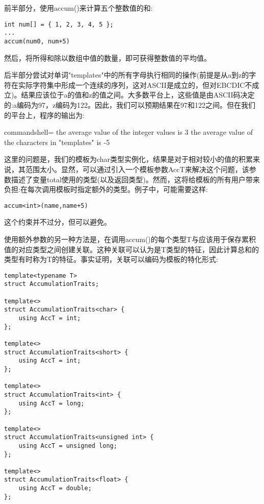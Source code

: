 前半部分，使用accum()来计算五个整数值的和:

\begin{lstlisting}[style=styleCXX]
int num[] = { 1, 2, 3, 4, 5 };
...
accum(num0, num+5)
\end{lstlisting}

然后，将所得和除以数组中值的数量，即可获得整数值的平均值。

后半部分尝试对单词"templates"中的所有字母执行相同的操作(前提是从a到z的字符在实际字符集中形成一个连续的序列，这对ASCII是成立的，但对EBCDIC不成立)。结果应该位于a的值和z的值之间。大多数平台上，这些值是由ASCII码决定的:a编码为97，z编码为122。因此，我们可以预期结果在97和122之间。但在我们的平台上，程序的输出为:

\begin{tcblisting}{commandshell={}}
the average value of the integer values is 3
the average value of the characters in "templates" is -5
\end{tcblisting}

这里的问题是，我们的模板为char类型实例化，结果是对于相对较小的值的积累来说，其范围太小。显然，可以通过引入一个模板参数AccT来解决这个问题，该参数描述了变量total使用的类型(以及返回类型)。然而，这将给模板的所有用户带来负担:在每次调用模板时指定额外的类型。例子中，可能需要这样:

\begin{lstlisting}[style=styleCXX]
accum<int>(name,name+5)
\end{lstlisting}

这个约束并不过分，但可以避免。

使用额外参数的另一种方法是，在调用accum()的每个类型T与应该用于保存累积值的对应类型之间创建关联。这种关联可以认为是T类型的特征，因此计算总和的类型有时称为T的特征。事实证明，关联可以编码为模板的特化形式:

\begin{lstlisting}[style=styleCXX]
template<typename T>
struct AccumulationTraits;

template<>
struct AccumulationTraits<char> {
	using AccT = int;
};

template<>
struct AccumulationTraits<short> {
	using AccT = int;
};

template<>
struct AccumulationTraits<int> {
	using AccT = long;
};

template<>
struct AccumulationTraits<unsigned int> {
	using AccT = unsigned long;
};

template<>
struct AccumulationTraits<float> {
	using AccT = double;
};
\end{lstlisting}

